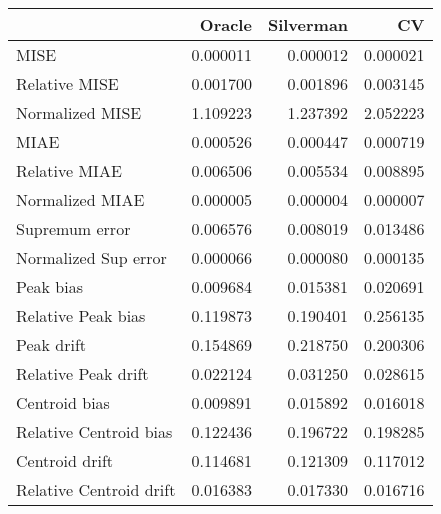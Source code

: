 \begin{tabular}{lrrr}
  \toprule
 & Oracle & Silverman & CV \\ 
  \midrule
MISE & 0.000011 & 0.000012 & 0.000021 \\ 
  Relative MISE & 0.001700 & 0.001896 & 0.003145 \\ 
  Normalized MISE & 1.109223 & 1.237392 & 2.052223 \\ 
  MIAE & 0.000526 & 0.000447 & 0.000719 \\ 
  Relative MIAE & 0.006506 & 0.005534 & 0.008895 \\ 
  Normalized MIAE & 0.000005 & 0.000004 & 0.000007 \\ 
  Supremum error & 0.006576 & 0.008019 & 0.013486 \\ 
  Normalized Sup error & 0.000066 & 0.000080 & 0.000135 \\ 
  Peak bias & 0.009684 & 0.015381 & 0.020691 \\ 
  Relative Peak bias & 0.119873 & 0.190401 & 0.256135 \\ 
  Peak drift & 0.154869 & 0.218750 & 0.200306 \\ 
  Relative Peak drift & 0.022124 & 0.031250 & 0.028615 \\ 
  Centroid bias & 0.009891 & 0.015892 & 0.016018 \\ 
  Relative Centroid bias & 0.122436 & 0.196722 & 0.198285 \\ 
  Centroid drift & 0.114681 & 0.121309 & 0.117012 \\ 
  Relative Centroid drift & 0.016383 & 0.017330 & 0.016716 \\ 
   \bottomrule
\end{tabular}
